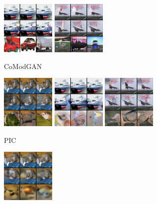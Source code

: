 \begin{figure}[t]
\begin{subfigure}[t]{0.17\textwidth}
      \includegraphics[height=\cifarimgheight]{figs/cigcvae/image-samples/cifar10/freeform_co_mod_gan_1_samples}
      \includegraphics[height=\cifarimgheight]{figs/cigcvae/image-samples/cifar10/freeform_co_mod_gan_3_samples}
      \caption{CoModGAN}
    \end{subfigure}
    \begin{subfigure}[t]{0.17\textwidth}
      \centering
      \includegraphics[height=\cifarimgheight]{figs/cigcvae/image-samples/cifar10/freeform_pic_0_samples}
      \includegraphics[height=\cifarimgheight]{figs/cigcvae/image-samples/cifar10/freeform_pic_1_samples}
      \includegraphics[height=\cifarimgheight]{figs/cigcvae/image-samples/cifar10/freeform_pic_3_samples}
      \caption{PIC}
    \end{subfigure}
    \begin{subfigure}[t]{0.17\textwidth}
      \centering
      \includegraphics[height=\cifarimgheight]{figs/cigcvae/image-samples/cifar10/freeform_anp_0_samples}

\end{subfigure}
\end{figure}
